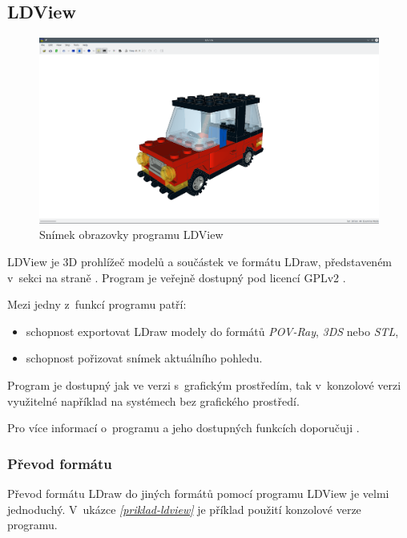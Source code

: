 \subsection{LDView}\label{podsekce-ldview}
\begin{figure}[htbp]
        \centering
        \includegraphics[width=\textwidth,height=\textheight,keepaspectratio]{images/ldview.png}
        \caption{Snímek obrazovky programu LDView}
\end{figure}

LDView je 3D prohlížeč modelů a součástek ve formátu LDraw, představeném v~sekci \emph{} na straně \emph{\pageref{ldraw-format}}. Program je veřejně dostupný pod licencí \gls{GPLv2} \autocite{GPLv2}.

Mezi jedny z~funkcí programu patří: 
\begin{itemize}
    \item schopnost exportovat LDraw modely do formátů \textit{POV-Ray}, \textit{3DS} nebo \textit{STL},
    \item schopnost pořizovat snímek aktuálního pohledu.
\end{itemize}

Program je dostupný jak ve verzi s~grafickým prostředím, tak v~konzolové verzi využitelné například na systémech bez grafického prostředí.

Pro více informací o~programu a jeho dostupných funkcích doporučuji \autocite{ldview}.

\subsubsection*{Převod formátu}

Převod formátu LDraw do jiných formátů pomocí programu LDView je velmi jednoduchý. V~ukázce \emph{\ref{priklad-ldview}} je příklad použití konzolové verze programu. 

